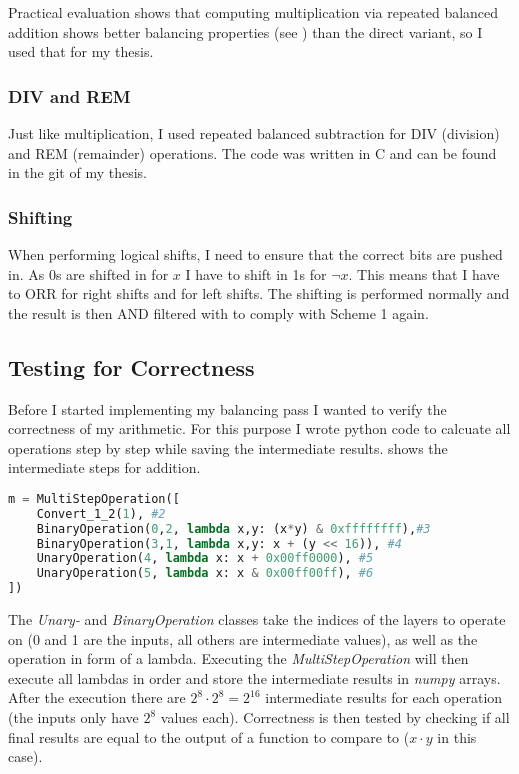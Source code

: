 Practical evaluation shows that computing multiplication via repeated balanced addition shows better balancing properties (see ) than the direct variant, so I used that for my thesis.

\subsubsection{DIV and REM}
Just like multiplication, I used repeated balanced subtraction for DIV (division) and REM (remainder) operations.
The code was written in C and can be found in the git of my thesis\cite{git}.

\subsubsection{Shifting}
When performing logical shifts, I need to ensure that the correct bits are pushed in.
As 0s are shifted in for $x$ I have to shift in 1s for $\neg{x}$.
This means that I have to ORR  for right shifts and  for left shifts.
The shifting is performed normally and the result is then AND filtered with  to comply with Scheme 1 again.

\subsection{Testing for Correctness}
Before I started implementing my balancing pass I wanted to verify the correctness of my arithmetic.
For this purpose I wrote python code to calcuate all operations step by step while saving the intermediate results.
 shows the intermediate steps for addition.

\begin{lstlisting}[language=python, caption=Step-by-step execution of balanced multiplication, label=lst:multiop]
m = MultiStepOperation([
    Convert_1_2(1), #2
    BinaryOperation(0,2, lambda x,y: (x*y) & 0xffffffff),#3
    BinaryOperation(3,1, lambda x,y: x + (y << 16)), #4
    UnaryOperation(4, lambda x: x + 0x00ff0000), #5
    UnaryOperation(5, lambda x: x & 0x00ff00ff), #6
])
\end{lstlisting}

The \emph{Unary-} and \emph{BinaryOperation} classes take the indices of the layers to operate on (0 and 1 are the inputs, all others are intermediate values), as well as the operation in form of a lambda.
Executing the \emph{MultiStepOperation} will then execute all lambdas in order and store the intermediate results in \emph{numpy} arrays.
After the execution there are $2^8 \cdot 2^8 = 2^{16}$ intermediate results for each operation (the inputs only have $2^8$ values each).
Correctness is then tested by checking if all final results are equal to the output of a function to compare to ($x \cdot y$ in this case).

